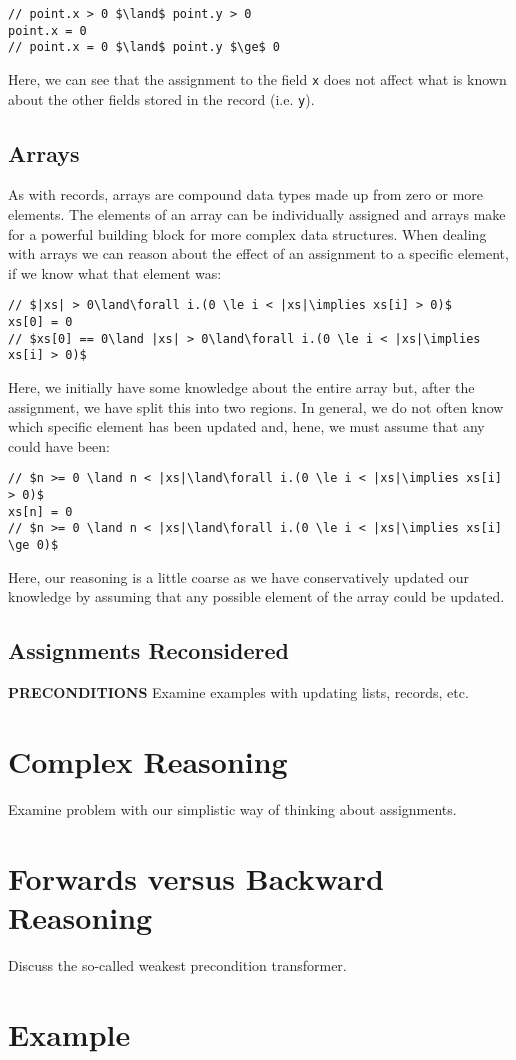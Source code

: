 \begin{lstlisting}
// point.x > 0 $\land$ point.y > 0
point.x = 0
// point.x = 0 $\land$ point.y $\ge$ 0
\end{lstlisting}

Here, we can see that the assignment to the field \lstinline{x} does not affect what is known about the other fields stored in the record (i.e. \lstinline{y}).

\subsection{Arrays}
As with records, arrays are compound data types made up from zero or more elements.  The elements of an array can be individually assigned and arrays make for a powerful building block for more complex data structures.  When dealing with arrays we can reason about the effect of an assignment to a specific element, if we know what that element was:

\begin{lstlisting}
// $|xs| > 0\land\forall i.(0 \le i < |xs|\implies xs[i] > 0)$
xs[0] = 0
// $xs[0] == 0\land |xs| > 0\land\forall i.(0 \le i < |xs|\implies xs[i] > 0)$
\end{lstlisting}

Here, we initially have some knowledge about the entire array but, after the assignment, we have split this into two regions.  In general, we do not often know which specific element has been updated and, hene, we must assume that any could have been:

\begin{lstlisting}
// $n >= 0 \land n < |xs|\land\forall i.(0 \le i < |xs|\implies xs[i] > 0)$
xs[n] = 0
// $n >= 0 \land n < |xs|\land\forall i.(0 \le i < |xs|\implies xs[i] \ge 0)$
\end{lstlisting}

Here, our reasoning is a little coarse as we have conservatively updated our knowledge by assuming that any possible element of the array could be updated.

\subsection{Assignments Reconsidered}

{\bf PRECONDITIONS}
Examine examples with updating lists, records, etc.

\section{Complex Reasoning}
Examine problem with our simplistic way of thinking about assignments.

\section{Forwards versus Backward Reasoning}
Discuss the so-called weakest precondition transformer.

\section{Example}

